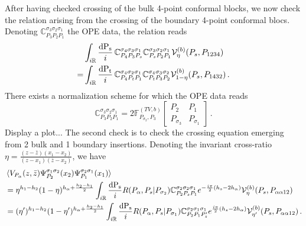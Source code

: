 \documentclass[11pt]{article}
\begin{document}
After having checked crossing of the bulk 4-point conformal blocks, we now check the relation arising from the crossing of the boundary 4-point conformal blocs. Denoting $\mathbb{C}_{P_3 P_2 P_1}^{\sigma_3 \sigma_2 \sigma_1}$ the OPE data, the relation reads
\begin{equation}
\begin{aligned}
    &\int_{i\mathbb{R}} \frac{\rm{d}P_s}{i}\,\mathbb{C}_{P_4 P_3 P_s}^{\sigma_4 \sigma_3 \sigma_1} \mathbb{C}_{P_s P_2 P_1}^{\sigma_3 \sigma_2 \sigma_1} \mathcal{V}_{\eta}^{(b)}(P_s,P_{1234})\\
    =&\int_{i\mathbb{R}} \frac{\rm{d}P_t}{i}\,\mathbb{C}_{P_4 P_t P_1}^{\sigma_4 \sigma_2 \sigma_1} \mathbb{C}_{P_t P_3 P_2}^{\sigma_4 \sigma_3 \sigma_2} \mathcal{V}_{1-\eta}^{(b)}(P_s,P_{1432})\,.
\end{aligned}
\end{equation}
There exists a normalization scheme for which the OPE data reads
\begin{equation}
    \mathbb{C}_{P_3 P_2 P_1}^{\sigma_3 \sigma_2 \sigma_1} = 2\mathbb{F}^{(TV,b)}_{P_{\sigma_2},P_3}\begin{bmatrix}
        P_2 & P_1 \\
        P_{\sigma_3} & P_{\sigma_1}
    \end{bmatrix}\,.
\end{equation}
{\color{red}Display a plot...}
The second check is to check the crossing equation emerging from 2 bulk and 1 boundary insertions. Denoting the invariant cross-ratio $\eta = \frac{(z-\bar{z})(x_1-x_2)}{(z-x_1)(\bar{z}-x_2)}$, we have
\begin{equation}\label{eq:spacelikebulktobdy}
    \begin{aligned}
        &\braket{V_{P_{\alpha}}(z,\bar{z})\Psi_{P_2}^{\sigma_1 \sigma_2}(x_2)\Psi_{P_1}^{\sigma_2 \sigma_1}(x_1)}\\
        &= \eta^{h_1-h_2}(1-\eta)^{h_{\alpha}+\frac{h_2-h_1}{2}}\int_{i\mathbb{R}} \frac{\rm{d}P_s}{i} R(P_\alpha, P_s | P_{\sigma_2})\mathbb{C}_{P_2 P_s P_1}^{\sigma_2 \sigma_2 \sigma_1} e^{-\frac{i\pi}{2}(h_s-2h_{\alpha})}\mathcal{V}_{\eta}^{(b)}(P_s, P_{\alpha \alpha 1 2})\\
        &= (\eta')^{h_1-h_2}(1-\eta')^{h_{\alpha}+\frac{h_2-h_1}{2}}\int_{i\mathbb{R}} \frac{\rm{d}P_s}{i} R(P_\alpha, P_s | P_{\sigma_1})\mathbb{C}_{P_2 P_1 P'_s}^{\sigma_2 \sigma_1 \sigma_1} e^{\frac{i\pi}{2}(h_s-2h_{\alpha})}\mathcal{V}_{\eta'}^{(b)}(P_s, P_{\alpha \alpha 1 2})\,.
    \end{aligned}
\end{equation}
\end{document}
